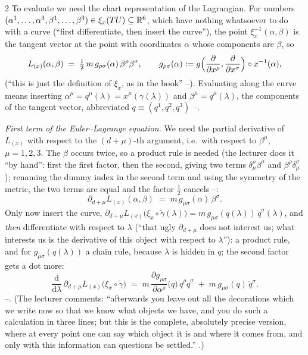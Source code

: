 \begin{paracol}{2}
To evaluate we need the chart representation of the Lagrangian. For numbers $(\alpha^1,\dots,\alpha^3,\beta^1,\dots,\beta^3)\in\xi_x(T U)\subseteq\mathbb{R}^6$, which have nothing whatsoever to do with a curve (``first differentiate, then insert the curve''), the point $\xi_x^{-1}(\alpha,\beta)$ is the tangent vector at the point with coordinates $\alpha$ whose components are $\beta$, so
\begin{equation}\label{eq:var-Lchart}
  L_{(x)}(\alpha,\beta)\;=\;\tfrac12\,m\,g_{\rho\sigma}(\alpha)\,\beta^\rho\beta^\sigma,\qquad g_{\rho\sigma}(\alpha):=g\Bigl(\frac{\partial}{\partial x^\rho},\frac{\partial}{\partial x^\sigma}\Bigr)\circ x^{-1}(\alpha),
\end{equation}
(``this is just the definition of $\xi_x$, as in the book'' --). Evaluating along the curve means inserting $\alpha^\mu=q^\mu(\lambda)=x^\mu(\gamma(\lambda))$ and $\beta^\mu=\dot q^\mu(\lambda)$, the components of the tangent vector, abbreviated $q\equiv(q^1,q^2,q^3)$ --.

\emph{First term of the Euler--Lagrange equation.} We need the partial derivative of $L_{(x)}$ with respect to the $(d+\mu)$-th argument, i.e.\ with respect to $\beta^\mu$, $\mu=1,2,3$. The $\beta$ occurs twice, so a product rule is needed (the lecturer does it ``by hand'': first the first factor, then the second, giving two terms $\delta^\rho_\mu\beta^\sigma$ and $\beta^\rho\delta^\sigma_\mu$); renaming the dummy index in the second term and using the symmetry of the metric, the two terms are equal and the factor $\tfrac12$ cancels --:
\begin{equation}\label{eq:var-dbeta}
  \partial_{d+\mu}L_{(x)}(\alpha,\beta)\;=\;m\,g_{\mu\sigma}(\alpha)\,\beta^\sigma .
\end{equation}
Only now insert the curve, $\partial_{d+\mu}L_{(x)}\bigl(\xi_x\circ\tilde\gamma(\lambda)\bigr)=m\,g_{\mu\sigma}(q(\lambda))\,\dot q^\sigma(\lambda)$, and \emph{then} differentiate with respect to $\lambda$ (``that ugly $\partial_{d+\mu}$ does not interest us; what interests us is the derivative of this object with respect to $\lambda$''): a product rule, and for $g_{\mu\sigma}(q(\lambda))$ a chain rule, because $\lambda$ is hidden in $q$; the second factor gets a dot more:
\begin{equation}\label{eq:var-term1}
  \frac{\mathrm d}{\mathrm d\lambda}\,\partial_{d+\mu}L_{(x)}\bigl(\xi_x\circ\tilde\gamma\bigr)\;=\;m\,\frac{\partial g_{\mu\sigma}}{\partial\alpha^\rho}\bigl(q\bigr)\,\dot q^\rho\dot q^\sigma\;+\;m\,g_{\mu\sigma}(q)\,\ddot q^\sigma .
\end{equation}
--. (The lecturer comments: ``afterwards you leave out all the decorations which we write now so that we know what objects we have, and you do such a calculation in three lines; but this is the complete, absolutely precise version, where at every point one can say which object it is and where it comes from, and only with this information can questions be settled.'' .)


\end{paracol}
